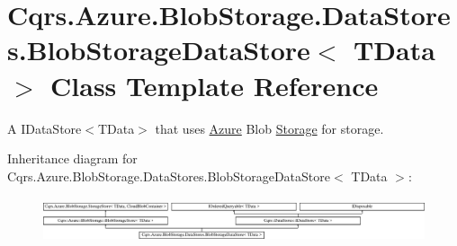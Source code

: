 \hypertarget{classCqrs_1_1Azure_1_1BlobStorage_1_1DataStores_1_1BlobStorageDataStore}{}\section{Cqrs.\+Azure.\+Blob\+Storage.\+Data\+Stores.\+Blob\+Storage\+Data\+Store$<$ T\+Data $>$ Class Template Reference}
\label{classCqrs_1_1Azure_1_1BlobStorage_1_1DataStores_1_1BlobStorageDataStore}


A I\+Data\+Store$<$\+T\+Data$>$ that uses \hyperlink{namespaceCqrs_1_1Azure}{Azure} Blob \hyperlink{namespaceCqrs_1_1Azure_1_1Storage}{Storage} for storage.  


Inheritance diagram for Cqrs.\+Azure.\+Blob\+Storage.\+Data\+Stores.\+Blob\+Storage\+Data\+Store$<$ T\+Data $>$\+:\begin{figure}[H]
\begin{center}
\leavevmode
\includegraphics[height=1.352657cm]{classCqrs_1_1Azure_1_1BlobStorage_1_1DataStores_1_1BlobStorageDataStore}
\end{center}
\end{figure}
